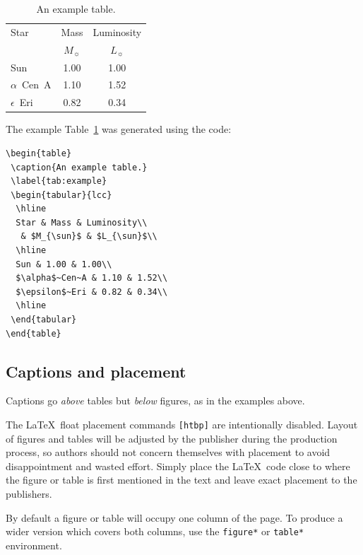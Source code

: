 \documentclass[a4paper,fleqn,usenatbib,useAMS]{mnras}
\begin{document}
\begin{table}
 \caption{An example table.}
 \label{tab:example}
 \begin{tabular}{lcc}
  \hline
  Star & Mass & Luminosity\\
   & $M_{\sun}$ & $L_{\sun}$\\
  \hline
  Sun & 1.00 & 1.00\\
  $\alpha$~Cen~A & 1.10 & 1.52\\
  $\epsilon$~Eri & 0.82 & 0.34\\
  \hline
 \end{tabular}
\end{table}
The example Table~\ref{tab:example} was generated using the code:
\begin{verbatim}
\begin{table}
 \caption{An example table.}
 \label{tab:example}
 \begin{tabular}{lcc}
  \hline
  Star & Mass & Luminosity\\
   & $M_{\sun}$ & $L_{\sun}$\\
  \hline
  Sun & 1.00 & 1.00\\
  $\alpha$~Cen~A & 1.10 & 1.52\\
  $\epsilon$~Eri & 0.82 & 0.34\\
  \hline
 \end{tabular}
\end{table}
\end{verbatim}

\subsection{Captions and placement}
Captions go \emph{above} tables but \emph{below} figures, as in the examples above.

The \LaTeX\ float placement commands \verb'[htbp]' are intentionally disabled.
Layout of figures and tables will be adjusted by the publisher during the production process, so authors should not concern themselves with placement to avoid disappointment and wasted effort.
Simply place the \LaTeX\ code close to where the figure or table is first mentioned in the text and leave exact placement to the publishers.

By default a figure or table will occupy one column of the page.
To produce a wider version which covers both columns, use the \verb'figure*' or \verb'table*'  environment.
\end{document}
